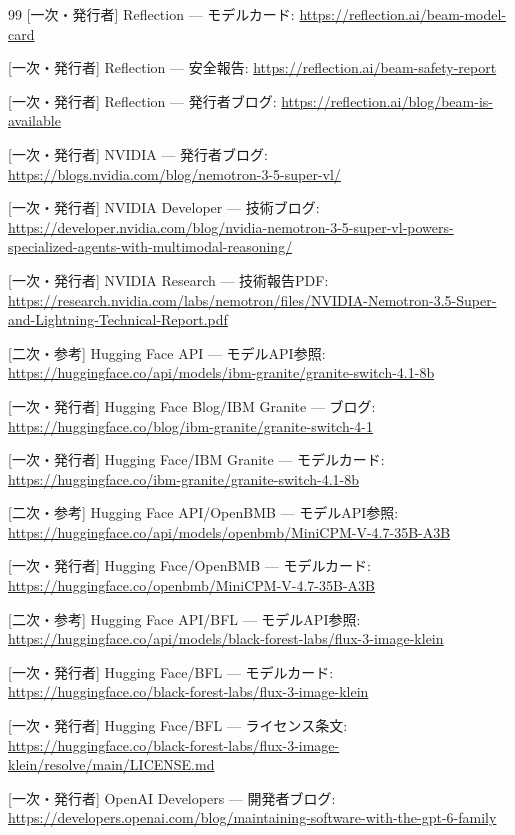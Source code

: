 \documentclass[lualatex,a4paper,10pt]{jlreq}
\begin{document}
\begin{thebibliography}{99}
 [一次・発行者] Reflection — モデルカード: \url{https://reflection.ai/beam-model-card}

 [一次・発行者] Reflection — 安全報告: \url{https://reflection.ai/beam-safety-report}

 [一次・発行者] Reflection — 発行者ブログ: \url{https://reflection.ai/blog/beam-is-available}

 [一次・発行者] NVIDIA — 発行者ブログ: \url{https://blogs.nvidia.com/blog/nemotron-3-5-super-vl/}

 [一次・発行者] NVIDIA Developer — 技術ブログ: \url{https://developer.nvidia.com/blog/nvidia-nemotron-3-5-super-vl-powers-specialized-agents-with-multimodal-reasoning/}

 [一次・発行者] NVIDIA Research — 技術報告PDF: \url{https://research.nvidia.com/labs/nemotron/files/NVIDIA-Nemotron-3.5-Super-and-Lightning-Technical-Report.pdf}

 [二次・参考] Hugging Face API — モデルAPI参照: \url{https://huggingface.co/api/models/ibm-granite/granite-switch-4.1-8b}

 [一次・発行者] Hugging Face Blog/IBM Granite — ブログ: \url{https://huggingface.co/blog/ibm-granite/granite-switch-4-1}

 [一次・発行者] Hugging Face/IBM Granite — モデルカード: \url{https://huggingface.co/ibm-granite/granite-switch-4.1-8b}

 [二次・参考] Hugging Face API/OpenBMB — モデルAPI参照: \url{https://huggingface.co/api/models/openbmb/MiniCPM-V-4.7-35B-A3B}

 [一次・発行者] Hugging Face/OpenBMB — モデルカード: \url{https://huggingface.co/openbmb/MiniCPM-V-4.7-35B-A3B}

 [二次・参考] Hugging Face API/BFL — モデルAPI参照: \url{https://huggingface.co/api/models/black-forest-labs/flux-3-image-klein}

 [一次・発行者] Hugging Face/BFL — モデルカード: \url{https://huggingface.co/black-forest-labs/flux-3-image-klein}

 [一次・発行者] Hugging Face/BFL — ライセンス条文: \url{https://huggingface.co/black-forest-labs/flux-3-image-klein/resolve/main/LICENSE.md}

 [一次・発行者] OpenAI Developers — 開発者ブログ: \url{https://developers.openai.com/blog/maintaining-software-with-the-gpt-6-family}


\end{thebibliography}
\end{document}
